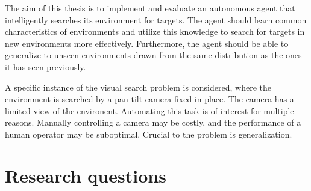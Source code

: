 The aim of this thesis is to implement and evaluate an autonomous agent that intelligently searches its environment for targets.
The agent should learn common characteristics of environments and utilize this knowledge to search for targets in new environments more effectively.
Furthermore, the agent should be able to generalize to unseen environments drawn from the same distribution as the ones it has seen previously.

A specific instance of the visual search problem is considered, where the environment is searched by a pan-tilt camera fixed in place.
The camera has a limited view of the environent.
Automating this task is of interest for multiple reasons.
Manually controlling a camera may be costly, and the performance of a human operator may be suboptimal.
Crucial to the problem is generalization.

\section{Research questions}
\label{sec:research-questions}

% 
% 
% 
% 
% 
% 
% 
% 

